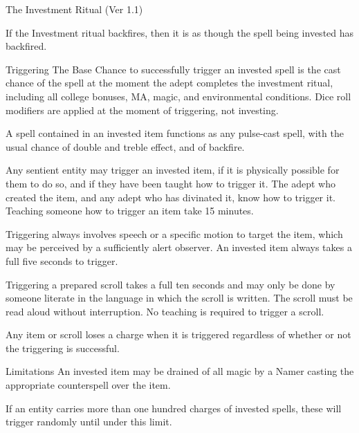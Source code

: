 \begin{multicols}{3}
\begin{ritual}[]{The Investment Ritual (Ver 1.1)}
\begin{Description}
If the Investment ritual backfires, then it is as though the spell
being invested has backfired.

\item[Triggering]
The Base Chance to successfully trigger an invested spell is the cast
chance of the spell at the moment the adept completes the investment
ritual, including all college bonuses, MA, magic, and environmental
conditions. Dice roll modifiers are applied at the moment of
triggering, not investing.

A spell contained in an invested item functions as any pulse-cast
spell, with the usual chance of double and treble effect, and of
backfire.

Any sentient entity may trigger an invested item, if it is physically
possible for them to do so, and if they have been taught how to
trigger it. The adept who created the item, and any adept who has
divinated it, know how to trigger it. Teaching someone how to trigger
an item take 15 minutes.

Triggering always involves speech or a specific motion to target the
item, which may be perceived by a sufficiently alert observer. An
invested item always takes a full five seconds to trigger.

Triggering a prepared scroll takes a full ten seconds and may only be
done by someone literate in the language in which the scroll is
written. The scroll must be read aloud without interruption. No
teaching is required to trigger a scroll.

Any item or scroll loses a charge when it is triggered regardless of
whether or not the triggering is successful.

\item[Limitations]
An invested item may be drained of all magic by a Namer casting the
appropriate counterspell over the item.

If an entity carries more than one hundred charges of invested spells,
these will trigger randomly until under this limit.

\end{Description}
\end{ritual}

\raggedcolumns
\clearemptydoublepage
\end{multicols}
